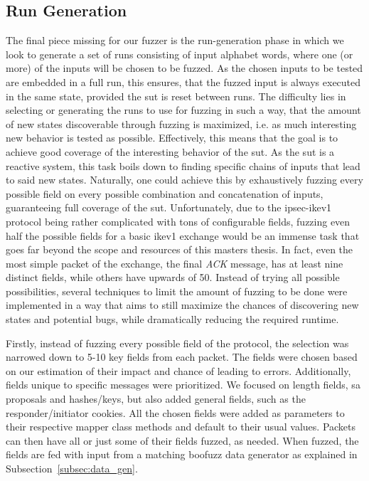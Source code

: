 \subsection{Run Generation} \label{subsec:run_generation}
The final piece missing for our fuzzer is the run-generation phase in which we look to generate a set of runs consisting of input alphabet words, where one (or more) of the inputs will be chosen to be fuzzed. As the chosen inputs to be tested are embedded in a full run, this ensures, that the fuzzed input is always executed in the same state, provided the \ac{sut} is reset between runs. The difficulty lies in selecting or generating the runs to use for fuzzing in such a way, that the amount of new states discoverable through fuzzing is maximized, i.e. as much interesting new behavior is tested as possible. Effectively, this means that the goal is to achieve good coverage of the interesting behavior of the \ac{sut}. As the \ac{sut} is a reactive system, this task boils down to finding specific chains of inputs that lead to said new states. Naturally, one could achieve this by exhaustively fuzzing every possible field on every possible combination and concatenation of inputs, guaranteeing full coverage of the \ac{sut}. Unfortunately, due to the \ac{ipsec}-\ac{ike}v1 protocol being rather complicated with tons of configurable fields, fuzzing even half the possible fields for a basic \ac{ike}v1 exchange would be an immense task that goes far beyond the scope and resources of this masters thesis. In fact, even the most simple packet of the exchange, the final \emph{ACK} message, has at least nine distinct fields, while others have upwards of 50. Instead of trying all possible possibilities, several techniques to limit the amount of fuzzing to be done were implemented in a way that aims to still maximize the chances of discovering new states and potential bugs, while dramatically reducing the required runtime. 

Firstly, instead of fuzzing every possible field of the protocol, the selection was narrowed down to 5-10 key fields from each packet. The fields were chosen based on our estimation of their impact and chance of leading to errors. Additionally, fields unique to specific messages were prioritized. We focused on length fields, \ac{sa} proposals and hashes/keys, but also added general fields, such as the responder/initiator cookies. All the chosen fields were added as parameters to their respective mapper class methods and default to their usual values. Packets can then have all or just some of their fields fuzzed, as needed. When fuzzed, the fields are fed with input from a matching boofuzz data generator as explained in Subsection~\ref{subsec:data_gen}.

